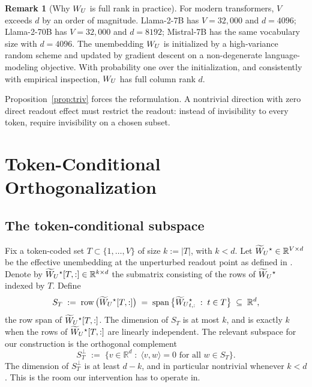 \documentclass[11pt,letterpaper]{article}
\theoremstyle{plain}
\theoremstyle{definition}
\newtheorem{remark}[theorem]{Remark}
\DeclareMathOperator{\rowsp}{row}
\DeclareMathOperator{\spann}{span}
\newcommand{\R}{\mathbb{R}}
\newcommand{\1}{\mathbf{1}}
\newcommand{\WU}{W_{U}\mathchoice{}{}{}{}}
\newcommand{\WUt}{\widetilde{W}_{U}\mathchoice{}{}{}{}}
\begin{document}
\begin{remark}[Why $\WU$ is full rank in practice]
For modern transformers, $V$ exceeds $d$ by an order of magnitude. Llama-2-7B has $V = 32{,}000$ and $d = 4096$; Llama-2-70B has $V = 32{,}000$ and $d = 8192$; Mistral-7B has the same vocabulary size with $d = 4096$. The unembedding $\WU$ is initialized by a high-variance random scheme and updated by gradient descent on a non-degenerate language-modeling objective. With probability one over the initialization, and consistently with empirical inspection, $\WU$ has full column rank $d$.
\end{remark}

Proposition~\ref{prop:triv} forces the reformulation. A nontrivial direction with zero direct readout effect must restrict the readout: instead of invisibility to every token, require invisibility on a chosen subset.

\section{Token-Conditional Orthogonalization}\label{sec:conditional}

\subsection{The token-conditional subspace}

Fix a token-coded set $T \subset \{1, \dots, V\}$ of size $k := |T|$, with $k < d$. Let $\WUt^\star \in \R^{V \times d}$ be the effective unembedding at the unperturbed readout point as defined in . Denote by $\WUt^\star[T,:] \in \R^{k \times d}$ the submatrix consisting of the rows of $\WUt^\star$ indexed by $T$. Define
\begin{equation}
S_T \;:=\; \rowsp\big(\WUt^\star[T,:]\big) \;=\; \spann\big\{ \WUt^\star_{t,:}\; :\; t \in T \big\} \;\subseteq\; \R^d,
\label{eq:ST}
\end{equation}
the row span of $\WUt^\star[T,:]$. The dimension of $S_T$ is at most $k$, and is exactly $k$ when the rows of $\WUt^\star[T,:]$ are linearly independent. The relevant subspace for our construction is the orthogonal complement
\begin{equation}
S_T^{\perp} \;:=\; \{ v \in \R^d \;:\; \langle v, w \rangle = 0 \text{ for all } w \in S_T \}.
\label{eq:STperp}
\end{equation}
The dimension of $S_T^\perp$ is at least $d - k$, and in particular nontrivial whenever $k < d$. This is the room our intervention has to operate in.
\end{document}
